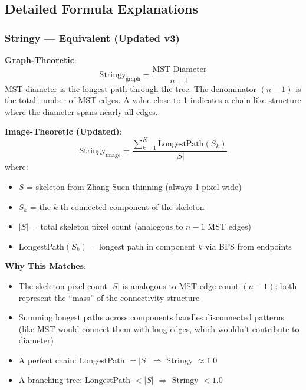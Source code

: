 \documentclass[11pt]{article}
\begin{document}
\subsection{Detailed Formula Explanations}

\subsubsection{Stringy — \textcolor{equivalent}{Equivalent} (Updated v3)}

\textbf{Graph-Theoretic}:
\begin{equation}
    \text{Stringy}_{\text{graph}} = \frac{\text{MST Diameter}}{n - 1}
\end{equation}
MST diameter is the longest path through the tree. The denominator $(n-1)$ is the total number of MST edges. A value close to 1 indicates a chain-like structure where the diameter spans nearly all edges.

\textbf{Image-Theoretic (Updated)}:
\begin{equation}
    \text{Stringy}_{\text{image}} = \frac{\sum_{k=1}^{K} \text{LongestPath}(S_k)}{|S|}
\end{equation}
where:
\begin{itemize}
    \item $S$ = skeleton from Zhang-Suen thinning (always 1-pixel wide)
    \item $S_k$ = the $k$-th connected component of the skeleton
    \item $|S|$ = total skeleton pixel count (analogous to $n-1$ MST edges)
    \item LongestPath$(S_k)$ = longest path in component $k$ via BFS from endpoints
\end{itemize}

\textbf{Why This Matches}:
\begin{itemize}
    \item The skeleton pixel count $|S|$ is analogous to MST edge count $(n-1)$: both represent the ``mass'' of the connectivity structure
    \item Summing longest paths across components handles disconnected patterns (like MST would connect them with long edges, which wouldn't contribute to diameter)
    \item A perfect chain: LongestPath $= |S|$ $\Rightarrow$ Stringy $\approx 1.0$
    \item A branching tree: LongestPath $< |S|$ $\Rightarrow$ Stringy $< 1.0$
\end{itemize}
\end{document}
